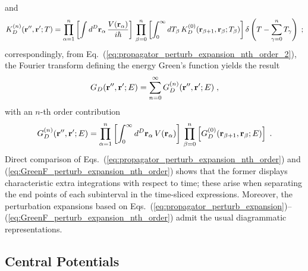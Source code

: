 \documentclass[a4paper,preprint,draft,showpacs,amsmath,amsfonts,amssymb,aps,prd]{revtex4}%
\begin{document}
and
\begin{equation}
K^{(n)}_{D}({\bf r}'', {\bf r}' ; T)
=
\prod_{\alpha=1}^{n} \left[
 \int
d^{D} {\bf r}_{\alpha} \,
\frac{   V({\bf r}_{\alpha})  }{i \hbar} 
\right]
\,
\prod_{\beta=0}^{n} \left[ \int_{0}^{\infty} 
d T_{\beta}  \,  
K^{(0)}_{D}({\bf r}_{\beta + 1}, {\bf r}_{\beta} ; T_{\beta} )  \right]
\,
\!
\delta
 \left(  
T - 
\sum_{\gamma=0}^{n} T_{\gamma}
 \right)
\;   ;
\label{eq:propagator_perturb_expansion_nth_order_2}
\end{equation}
correspondingly, from Eq.~(\ref{eq:propagator_perturb_expansion_nth_order_2}),
the Fourier transform
defining
the energy Green's function yields the result
\begin{equation}
G_{D}({\bf r}'', {\bf r}' ; E) 
=
\sum_{n=0}^{\infty}
G^{(n)}_{D}({\bf r}'', {\bf r}' ; E) 
\;  ,
\label{eq:GreenF_perturb_expansion}
\end{equation}
with an $n$-th order contribution
\begin{equation}
G^{(n)}_{D}({\bf r}'', {\bf r}' ; E) 
=
\prod_{\alpha=1}^{n} 
\left[ 
\int_{0}^{\infty}
d^{D} {\bf r}_{\alpha} \,
 V({\bf r}_{\alpha})  
\right]
\,
\prod_{\beta=0}^{n} \left[ 
G^{(0)}_{D}({\bf r}_{\beta + 1}, {\bf r}_{\beta} ; E )  \right]
\;  .
\label{eq:GreenF_perturb_expansion_nth_order}
\end{equation}
Direct comparison of 
Eqs.~(\ref{eq:propagator_perturb_expansion_nth_order}) 
and (\ref{eq:GreenF_perturb_expansion_nth_order})
shows that the former displays characteristic extra integrations with respect to time;
these arise when separating the end points of each subinterval
in the time-sliced expressions.
Moreover, the perturbation
expansions based on 
Eqs.~(\ref{eq:propagator_perturb_expansion})--(\ref{eq:GreenF_perturb_expansion_nth_order})
admit the usual diagrammatic representations.


\subsection{Central Potentials}
\label{sec:central_potentials}
\end{document}
